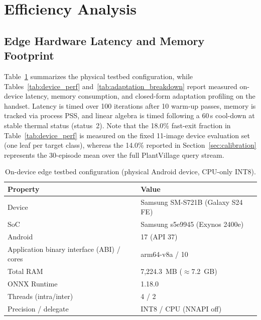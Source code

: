 \documentclass[preprint,12pt]{elsarticle}
\begin{document}
\section{Efficiency Analysis}
\label{sec:efficiency}

\subsection{Edge Hardware Latency and Memory Footprint}
\label{sec:edge_hardware}
Table~\ref{tab:device_spec} summarizes the physical testbed configuration, while Tables~\ref{tab:device_perf} and~\ref{tab:adaptation_breakdown} report measured on-device latency, memory consumption, and closed-form adaptation profiling on the handset. Latency is timed over 100 iterations after 10 warm-up passes, memory is tracked via process PSS, and linear algebra is timed following a 60\,s cool-down at stable thermal status (status~2). Note that the 18.0\% fast-exit fraction in Table~\ref{tab:device_perf} is measured on the fixed 11-image device evaluation set (one leaf per target class), whereas the 14.0\% reported in Section~\ref{sec:calibration} represents the 30-episode mean over the full PlantVillage query stream.

\begin{table}[htbp]
\caption{On-device edge testbed configuration (physical Android device, CPU-only INT8).}
\label{tab:device_spec}
\centering

\footnotesize
\begin{tabular}{ll}
\toprule
Property & Value \\
\midrule
Device & Samsung SM-S721B (Galaxy S24 FE) \\
SoC & Samsung s5e9945 (Exynos 2400e) \\
Android & 17 (API 37) \\
Application binary interface (ABI) / cores & arm64-v8a / 10 \\
Total RAM & 7,224.3~MB ($\approx$7.2~GB) \\
ONNX Runtime & 1.18.0 \\
Threads (intra/inter) & 4 / 2 \\
Precision / delegate & INT8 / CPU (NNAPI off) \\
\bottomrule
\end{tabular}
\end{table}
\end{document}
